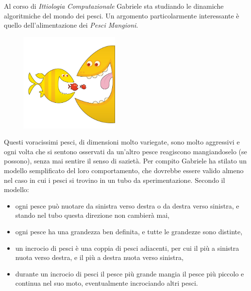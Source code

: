 
\makeatletter
\gdef\this@inputfilename{input.txt}
\gdef\this@outputfilename{output.txt}
\makeatother

\newcommand{\inputfile}{\texttt{input.txt}}
\newcommand{\outputfile}{\texttt{output.txt}}

\newenvironment{warning}
  {\par\begin{mdframed}[linewidth=2pt,linecolor=gray]%
    \begin{list}{}{\leftmargin=1cm
                   \labelwidth=\leftmargin}\item[\Large\ding{43}]}
  {\end{list}\end{mdframed}\par}

Al corso di \emph{Ittiologia Computazionale} Gabriele sta studiando le dinamiche algoritmiche del mondo dei pesci. Un argomento particolarmente interessante è quello dell'alimentazione dei \emph{Pesci Mangioni}.

\begin{figure}
\centering\includegraphics[width=5cm]{pesci.jpg}
\end{figure}

Questi voracissimi pesci, di dimensioni molto variegate, sono molto aggressivi e ogni volta che si sentono osservati da un'altro pesce reagiscono mangiandoselo (se possono), senza mai sentire il senso di sazietà. Per compito Gabriele ha stilato un modello semplificato del loro comportamento, che dovrebbe essere valido almeno nel caso in cui i pesci si trovino in un tubo da sperimentazione. Secondo il modello:

\begin{itemize}[nolistsep, itemsep=2mm]
	\item ogni pesce può nuotare da sinistra verso destra o da destra verso sinistra, e stando nel tubo questa direzione non cambierà mai,
	\item ogni pesce ha una grandezza ben definita, e tutte le grandezze sono distinte,
	\item un incrocio di pesci è una coppia di pesci adiacenti, per cui il più a sinistra nuota verso destra, e il più a destra nuota verso sinistra,
	\item durante un incrocio di pesci il pesce più grande mangia il pesce più piccolo e continua nel suo moto, eventualmente incrociando altri pesci.
\end{itemize}

